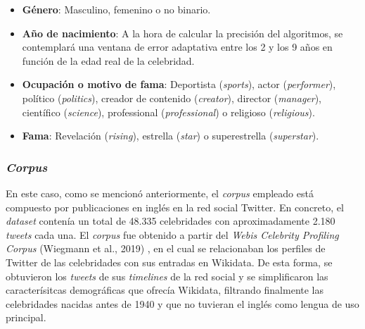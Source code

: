 \begin{itemize}
	\item \textbf{Género}: Masculino, femenino o no binario.
	\item \textbf{Año de nacimiento}: A la hora de calcular la precisión del algoritmos,
		se contemplará una ventana de error adaptativa entre los 2 y los 9 años en función de la edad real de la celebridad. 
	\item \textbf{Ocupación o motivo de fama}: Deportista (\textit{sports}), actor (\textit{performer}), político (\textit{politics}), creador de contenido (\textit{creator}),
		director (\textit{manager}), científico (\textit{science}), professional (\textit{professional}) o religioso (\textit{religious}).
	\item \textbf{Fama}: Revelación (\textit{rising}), estrella (\textit{star}) o superestrella (\textit{superstar}).
\end{itemize}

\subsubsection{\textit{Corpus}}

En este caso, como se mencionó anteriormente, el \textit{corpus} empleado está compuesto por publicaciones en inglés en la red social Twitter. En concreto,
el \textit{dataset} contenía un total de 48.335 celebridades con aproximadamente 2.180 \textit{tweets} cada una. El \textit{corpus} fue obtenido
a partir del \textit{Webis Celebrity Profiling Corpus} (Wiegmann et al., 2019) \cite{wiegmann2019celebrity}, en el cual se relacionaban los perfiles
de Twitter de las celebridades con sus entradas en Wikidata. De esta forma, se obtuvieron los \textit{tweets} de sus \textit{timelines} de la red social
y se simplificaron las caracterísitcas demográficas que ofrecía Wikidata, filtrando finalmente las celebridades nacidas antes de 1940 y que no tuvieran
el inglés como lengua de uso principal.

